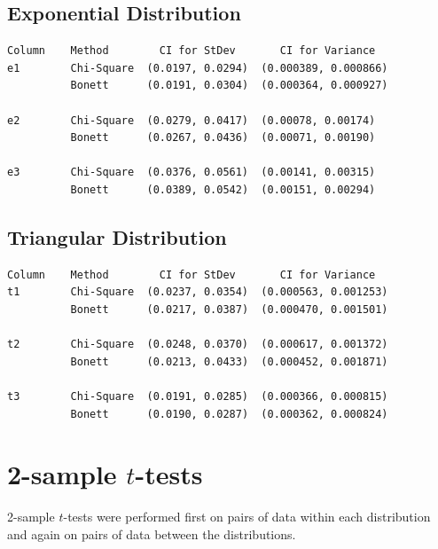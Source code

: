 \documentclass[letterpaper,10pt]{article}
\begin{document}
\subsection{Exponential Distribution}
\begin{samepage}
\begin{verbatim}
Column    Method        CI for StDev       CI for Variance
e1        Chi-Square  (0.0197, 0.0294)  (0.000389, 0.000866)
          Bonett      (0.0191, 0.0304)  (0.000364, 0.000927)
          
e2        Chi-Square  (0.0279, 0.0417)  (0.00078, 0.00174)
          Bonett      (0.0267, 0.0436)  (0.00071, 0.00190)
          
e3        Chi-Square  (0.0376, 0.0561)  (0.00141, 0.00315)
          Bonett      (0.0389, 0.0542)  (0.00151, 0.00294)
\end{verbatim}          
\end{samepage}
\subsection{Triangular Distribution}
\begin{samepage}
\begin{verbatim}
Column    Method        CI for StDev       CI for Variance
t1        Chi-Square  (0.0237, 0.0354)  (0.000563, 0.001253)
          Bonett      (0.0217, 0.0387)  (0.000470, 0.001501)
          
t2        Chi-Square  (0.0248, 0.0370)  (0.000617, 0.001372)
          Bonett      (0.0213, 0.0433)  (0.000452, 0.001871)
          
t3        Chi-Square  (0.0191, 0.0285)  (0.000366, 0.000815)
          Bonett      (0.0190, 0.0287)  (0.000362, 0.000824)
\end{verbatim}
\end{samepage}
\section{2-sample $t$-tests}
2-sample $t$-tests were performed first on pairs of data within each distribution and again on pairs of data between the distributions.
\end{document}
